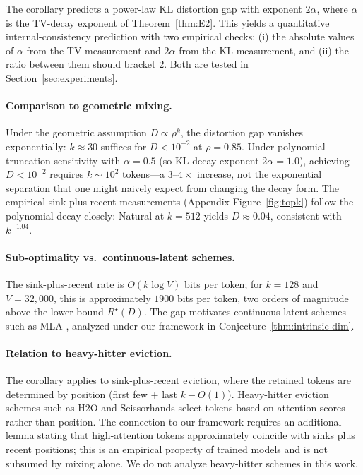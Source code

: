 \documentclass[11pt]{article}
\theoremstyle{plain}
\theoremstyle{definition}
\theoremstyle{remark}
\begin{document}
The corollary predicts a power-law KL distortion gap with exponent
$2\alpha$, where $\alpha$ is the TV-decay exponent of
Theorem~\ref{thm:E2}. This yields a quantitative
internal-consistency prediction with two empirical checks: (i) the
absolute values of $\alpha$ from the TV measurement and $2\alpha$
from the KL measurement, and (ii) the ratio between them should
bracket $2$. Both are tested in
Section~\ref{sec:experiments}.

\paragraph{Comparison to geometric mixing.}
Under the geometric assumption $D \propto \rho^k$, the distortion
gap vanishes exponentially: $k \approx 30$ suffices for $D < 10^{-2}$
at $\rho = 0.85$. Under polynomial truncation sensitivity with $\alpha = 0.5$ (so
KL decay exponent $2\alpha = 1.0$), achieving $D < 10^{-2}$ requires
$k \sim 10^{2}$ tokens---a $3$--$4\times$ increase, not the
exponential separation that one might naively expect from changing
the decay form. The empirical sink-plus-recent measurements
(Appendix Figure~\ref{fig:topk}) follow the polynomial decay closely:
Natural at $k = 512$ yields $D \approx 0.04$, consistent with
$k^{-1.04}$.

\paragraph{Sub-optimality vs.\ continuous-latent schemes.}
The sink-plus-recent rate is $O(k \log V)$ bits per token; for
$k = 128$ and $V = 32{,}000$, this is approximately $1900$ bits per
token, two orders of magnitude above the lower bound $R^\star(D)$.
The gap motivates continuous-latent schemes such as MLA
\citep{deepseek2024mla}, analyzed under our framework in
Conjecture~\ref{thm:intrinsic-dim}.

\paragraph{Relation to heavy-hitter eviction.}
The corollary applies to sink-plus-recent eviction, where the
retained tokens are determined by position (first few + last
$k - O(1)$). Heavy-hitter eviction schemes such as H2O
\citep{zhang2023h2o} and Scissorhands
\citep{liu2023scissorhands} select tokens based on attention scores
rather than position. The connection to our framework requires an
additional lemma stating that high-attention tokens approximately
coincide with sinks plus recent positions; this is an empirical
property of trained models and is not subsumed by mixing alone. We
do not analyze heavy-hitter schemes in this work.
\end{document}
